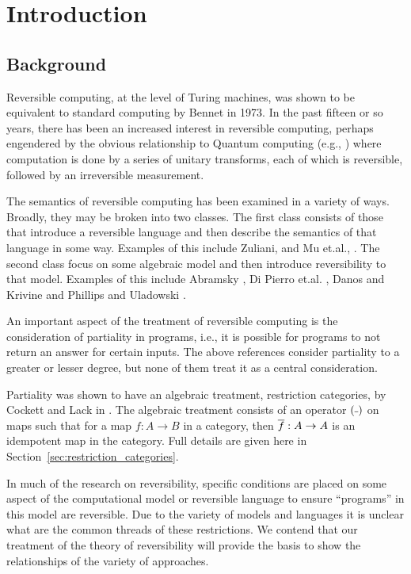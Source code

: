 \chapter{Introduction}
\section{Background}
\label{sec:background}

Reversible computing, at the level of Turing machines, was shown to be equivalent to standard
computing by Bennet \cite{bennett:1973reverse} in 1973. In the past fifteen or so years, there has
been an increased interest in reversible computing, perhaps engendered by the obvious relationship
to Quantum computing (e.g., \cite{neilsen2000:QuantumComputationAndInfo}) where computation is done
by a series of unitary transforms, each of which is reversible, followed by an irreversible
measurement.

The semantics of reversible computing has been examined in a variety of ways. Broadly, they may be
broken into two classes. The first class consists of those that introduce a reversible
language and then describe the semantics of that language in some way. Examples of this include
Zuliani, \cite{zuliani01:reversibility} and Mu et.al., \cite{muetal04:injreversible}. The second
class focus on some algebraic model and then introduce reversibility to that model. Examples of this
include Abramsky \cite{abramsky05:reversible}, Di Pierro et.al. \cite{DiPierro200625}, Danos and
Krivine \cite{danos2004reversible} and Phillips and Uladowski \cite{phillips2006operational}.

An important aspect of the treatment of reversible computing is the consideration of partiality in
programs, i.e., it is possible for programs to not return an answer for certain inputs. The above
references consider partiality to a greater or lesser degree, but none of them treat it as a central
consideration.

Partiality was shown to have an algebraic treatment, restriction categories, by Cockett and Lack in
\cite{cockett2002:restcategories1,cockettlack2003:restcategories2,cockettlack2004:restcategories3}. The
algebraic treatment consists of an operator $(\overline{~})$ on maps such that for a map $f:A\to B$ in a
category, then $\overline{f}:A\to A$ is an idempotent map in the category. Full details are given here in
Section~\ref{sec:restriction_categories}.

In much of the research on reversibility, specific conditions are placed on some aspect of the
computational model or reversible language to ensure ``programs'' in this model are reversible. Due
to the variety of models and languages it is unclear what are the common threads of these restrictions.
We contend that our treatment of the theory of reversibility will provide the basis to show the
relationships of the variety of approaches.

